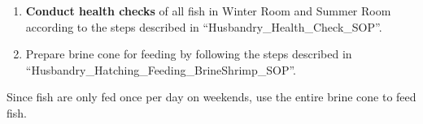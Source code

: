\documentclass[
  letterpaper,
  DIV=11,
  numbers=noendperiod]{scrreprt}
\begin{document}
\begin{enumerate}
\def\labelenumi{\arabic{enumi}.}
\item
  \textbf{Conduct health checks} of all fish in Winter Room and Summer
  Room according to the steps described in
  ``Husbandry\_Health\_Check\_SOP''.
\item
  Prepare brine cone for feeding by following the steps described in
  ``Husbandry\_Hatching\_Feeding\_BrineShrimp\_SOP''.
\end{enumerate}

\begin{tcolorbox}[enhanced jigsaw, rightrule=.15mm, title=\textcolor{quarto-callout-warning-color}{\faExclamationTriangle}\hspace{0.5em}{NOTES}, titlerule=0mm, opacitybacktitle=0.6, toprule=.15mm, bottomrule=.15mm, opacityback=0, left=2mm, colframe=quarto-callout-warning-color-frame, breakable, coltitle=black, colback=white, colbacktitle=quarto-callout-warning-color!10!white, bottomtitle=1mm, leftrule=.75mm, toptitle=1mm, arc=.35mm]

Since fish are only fed once per day on weekends, use the entire brine
cone to feed fish.

\end{tcolorbox}
\end{document}
